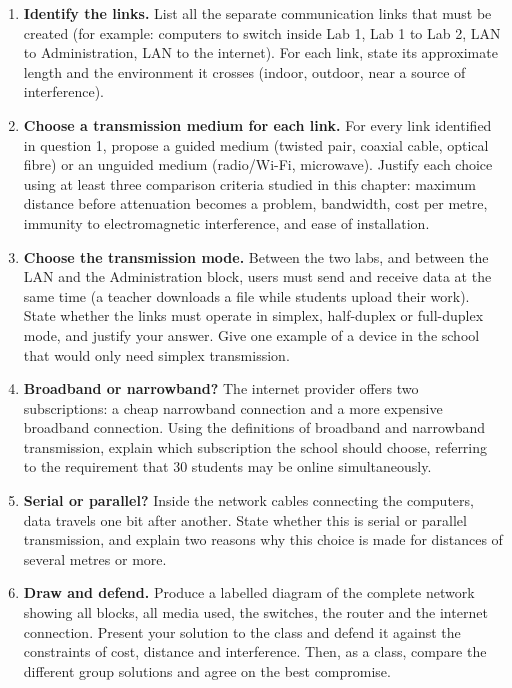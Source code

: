 \documentclass[11pt]{article}
\newcommand{\cle}[1]{{\popxbold\color{popdark}#1}}
\begin{document}
\begin{enumerate}
\item \textbf{Identify the links.} List all the separate communication links that must be created (for example: computers to switch inside Lab 1, Lab 1 to Lab 2, LAN to Administration, LAN to the internet). For each link, state its approximate length and the environment it crosses (indoor, outdoor, near a source of interference).

\item \textbf{Choose a transmission medium for each link.} For every link identified in question 1, propose a guided medium (twisted pair, coaxial cable, optical fibre) or an unguided medium (radio/Wi-Fi, microwave). Justify each choice using at least three comparison criteria studied in this chapter: maximum distance before attenuation becomes a problem, bandwidth, cost per metre, immunity to electromagnetic interference, and ease of installation.

\item \textbf{Choose the transmission mode.} Between the two labs, and between the LAN and the Administration block, users must send and receive data at the same time (a teacher downloads a file while students upload their work). State whether the links must operate in \cle{simplex}, \cle{half-duplex} or \cle{full-duplex} mode, and justify your answer. Give one example of a device in the school that would only need simplex transmission.

\item \textbf{Broadband or narrowband?} The internet provider offers two subscriptions: a cheap narrowband connection and a more expensive broadband connection. Using the definitions of \cle{broadband} and \cle{narrowband} transmission, explain which subscription the school should choose, referring to the requirement that 30 students may be online simultaneously.

\item \textbf{Serial or parallel?} Inside the network cables connecting the computers, data travels one bit after another. State whether this is \cle{serial} or \cle{parallel} transmission, and explain two reasons why this choice is made for distances of several metres or more.

\item \textbf{Draw and defend.} Produce a labelled diagram of the complete network showing all blocks, all media used, the switches, the router and the internet connection. Present your solution to the class and defend it against the constraints of cost, distance and interference. Then, as a class, compare the different group solutions and agree on the best compromise.
\end{enumerate}
\end{document}
